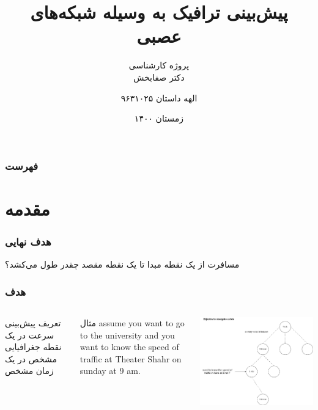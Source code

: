\documentclass{beamer}
\author[الهه داستان]{%
  الهه داستان\hfill
  ۹۶۳۱۰۲۵\\
}
\title{پیش‌بینی ترافیک به وسیله شبکه‌های عصبی}
\subtitle{%
  پروژه کارشناسی\\
  دکتر صفابخش
}
\institute[AUT]{دانشگاه صنعتی امیرکبیر}
\date{زمستان ۱۴۰۰}
\begin{document}
\begin{persian}

\begin{frame}
  \titlepage{}
\end{frame}

\begin{frame}
  \frametitle{فهرست}
  \tableofcontents{}
\end{frame}

\section{مقدمه}

\begin{frame}
  \frametitle{هدف نهایی}
  \begin{block}{}
    مسافرت از یک نقطه مبدا تا یک نقطه مقصد چقدر طول می‌کشد؟
  \end{block}
\end{frame}

\begin{frame}
  \frametitle{هدف}
  \begin{columns}
    \begin{block}{تعریف}
      پیش‌بینی سرعت در یک نقطه جغرافیایی مشخص در یک زمان مشخص
    \end{block}
    \pause
    \begin{block}{مثال}
      assume you want to go to the university and you want to know the speed of traffic at Theater Shahr on sunday at 9 am.
    \end{block}
    \pause
    \includegraphics[height=0.5\textheight]{./img/dijkstra.png} %
  \end{columns}
\end{frame}


\end{persian}
\end{document}
